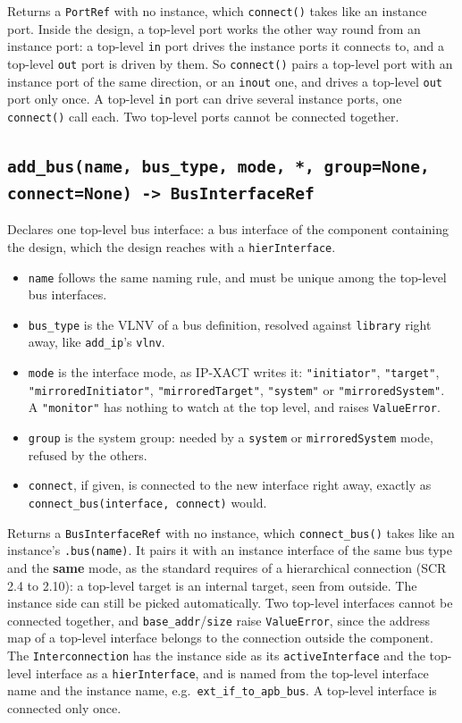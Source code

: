 \documentclass[11pt]{article}
\newcommand{\code}[1]{\texttt{#1}}
\begin{document}
Returns a \code{PortRef} with no instance, which \code{connect()} takes like an instance
port. Inside the design, a top-level port works the other way round from an instance
port: a top-level \code{in} port drives the instance ports it connects to, and a
top-level \code{out} port is driven by them. So \code{connect()} pairs a top-level port
with an instance port of the same direction, or an \code{inout} one, and drives a
top-level \code{out} port only once. A top-level \code{in} port can drive several instance
ports, one \code{connect()} call each. Two top-level ports cannot be connected together.

\subsection{\texttt{add\_bus(name, bus\_type, mode, *, group=None, connect=None) -> BusInterfaceRef}}

Declares one top-level bus interface: a bus interface of the component containing the
design, which the design reaches with a \code{hierInterface}.

\begin{itemize}
    \item \code{name} follows the same naming rule, and must be unique among the top-level
    bus interfaces.
    \item \code{bus\_type} is the VLNV of a bus definition, resolved against
    \code{library} right away, like \code{add\_ip}'s \code{vlnv}.
    \item \code{mode} is the interface mode, as IP-XACT writes it: \code{"initiator"},
    \code{"target"}, \code{"mirroredInitiator"}, \code{"mirroredTarget"},
    \code{"system"} or \code{"mirroredSystem"}. A \code{"monitor"} has nothing to watch
    at the top level, and raises \code{ValueError}.
    \item \code{group} is the system group: needed by a \code{system} or
    \code{mirroredSystem} mode, refused by the others.
    \item \code{connect}, if given, is connected to the new interface right away, exactly
    as \code{connect\_bus(interface, connect)} would.
\end{itemize}

Returns a \code{BusInterfaceRef} with no instance, which \code{connect\_bus()} takes like
an instance's \code{.bus(name)}. It pairs it with an instance interface of the same bus
type and the \textbf{same} mode, as the standard requires of a hierarchical connection
(SCR 2.4 to 2.10): a top-level target is an internal target, seen from outside. The
instance side can still be picked automatically. Two top-level interfaces cannot be
connected together, and \code{base\_addr}/\code{size} raise \code{ValueError}, since the
address map of a top-level interface belongs to the connection outside the component.
The \code{Interconnection} has the instance side as its \code{activeInterface} and the
top-level interface as a \code{hierInterface}, and is named from the top-level interface
name and the instance name, e.g.\ \code{ext\_if\_to\_apb\_bus}. A top-level interface is
connected only once.
\end{document}
